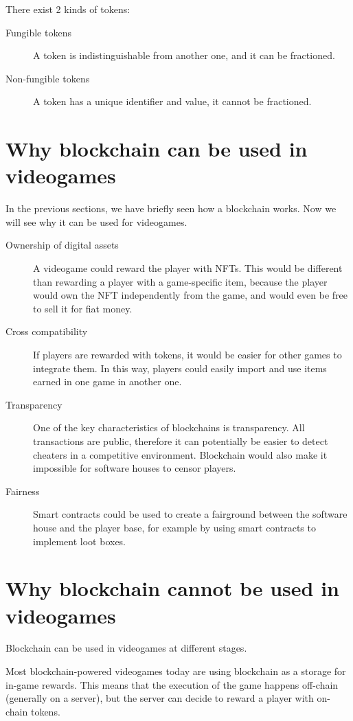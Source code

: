 \documentclass[12pt]{article}
\begin{document}
There exist 2 kinds of tokens:
\begin{description}
    \item[Fungible tokens] A token is indistinguishable from another one, and it can be fractioned. 
    \item[Non-fungible tokens] A token has a unique identifier and value, it cannot be fractioned. 
\end{description}

\section{Why blockchain can be used in videogames} \label{section:wbcbuiv}
In the previous sections, we have briefly seen how a blockchain works. Now we will see why it can be used for videogames.
\begin{description}
    \item[Ownership of digital assets] A videogame could reward the player with NFTs. This would be different than rewarding a player with a game-specific item, because the player would own the NFT independently from the game, and would even be free to sell it for fiat money.
    \item[Cross compatibility] If players are rewarded with tokens, it would be easier for other games to integrate them. In this way, players could easily import and use items earned in one game in another one.
    \item[Transparency] One of the key characteristics of blockchains is transparency. All transactions are public, therefore it can potentially be easier to detect cheaters in a competitive environment. Blockchain would also make it impossible for software houses to censor players.
    \item[Fairness] Smart contracts could be used to create a fairground between the software house and the player base, for example by using smart contracts to implement loot boxes.  
\end{description}

\section{Why blockchain cannot be used in videogames} \label{section:wbcnbuiv}
Blockchain can be used in videogames at different stages.

Most blockchain-powered videogames today are using blockchain as a storage for in-game rewards. This means that the execution of the game happens off-chain (generally on a server), but the server can decide to reward a player with on-chain tokens.
\end{document}
